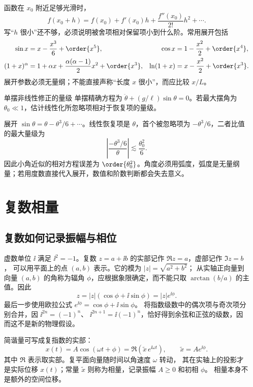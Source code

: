 函数在 $x_0$ 附近足够光滑时，
\begin{equation}
 f(x_0+h)=f(x_0)+f'(x_0)h+\frac{f''(x_0)}{2!}h^2+\cdots.
\end{equation}
写“$h$ 很小”还不够，必须说明被舍项相对保留项小到什么阶。常用展开包括
\begin{align}
 \sin x&=x-\frac{x^3}{6}+\order{x^5},&
 \cos x&=1-\frac{x^2}{2}+\order{x^4},\\
 (1+x)^\alpha&=1+\alpha x+\frac{\alpha(\alpha-1)}2x^2+\order{x^3},&
 \ln(1+x)&=x-\frac{x^2}{2}+\order{x^3}.
\end{align}
展开参数必须无量纲；不能直接声称“长度 $x$ 很小”，而应比较 $x/L$。

\begin{origexamplebox}{单摆非线性修正的量级}
单摆精确方程为 $\ddot\theta+(g/\ell)\sin\theta=0$。若最大摆角为 $\theta_0\ll1$，估计线性化所忽略项相对于恢复项的量级。
\end{origexamplebox}
\begin{xesolution}
展开 $\sin\theta=\theta-\theta^3/6+\cdots$。线性恢复项是 $\theta$，首个被忽略项为 $-\theta^3/6$，二者比值的最大量级为
\[
 \left|\frac{-\theta^3/6}{\theta}\right|\lesssim\frac{\theta_0^2}{6}.
\]
因此小角近似的相对方程误差为 $\order{\theta_0^2}$。角度必须用弧度，弧度是无量纲量；若用度数直接代入展开，数值和阶数判断都会失去意义。
\end{xesolution}

\section{复数相量}

\subsection{复数如何记录振幅与相位}
虚数单位 $\ii$ 满足 $\ii^2=-1$。复数 $z=a+\ii b$ 的实部记作 $\Re z=a$，虚部记作 $\Im z=b$，
可以用平面上的点 $(a,b)$ 表示。它的模为 $|z|=\sqrt{a^2+b^2}$；
从实轴正向量到向量 $(a,b)$ 的角称为辐角 $\phi$，应根据象限确定，而不能只取
$\arctan(b/a)$ 的主值。因此
\[
 z=|z|(\cos\phi+\ii\sin\phi)=|z|e^{\ii\phi}.
\]
最后一步使用欧拉公式 $e^{\ii\phi}=\cos\phi+\ii\sin\phi$。
将指数级数中的偶次项与奇次项分别合并，因 $\ii^{2n}=(-1)^n$、
$\ii^{2n+1}=\ii(-1)^n$，恰好得到余弦和正弦的级数，因而这不是新的物理假设。

简谐量可写成复指数的实部：
\begin{equation}
 x(t)=A\cos(\omega t+\phi)=\Re\!\left(\widetilde x\,e^{\ii\omega t}\right),
 \qquad \widetilde x=Ae^{\ii\phi}.
\end{equation}
其中 $\Re$ 表示取实部。复平面向量随时间以角速度 $\omega$ 转动，
其在实轴上的投影才是实际位移 $x(t)$；常量 $\widetilde x$ 则称为相量，记录振幅 $A\ge0$ 和初相 $\phi$。
相量本身不是额外的空间位移。

